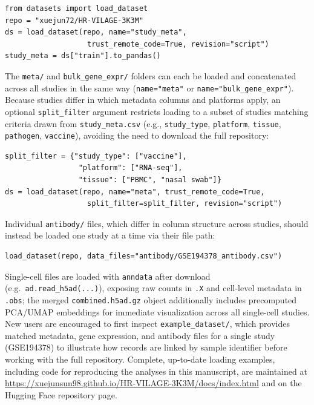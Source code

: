 \documentclass[
  12pt]{article}
\begin{document}
\begin{verbatim}
from datasets import load_dataset
repo = "xuejun72/HR-VILAGE-3K3M"
ds = load_dataset(repo, name="study_meta",
                   trust_remote_code=True, revision="script")
study_meta = ds["train"].to_pandas()
\end{verbatim}

The \texttt{meta/} and \texttt{bulk\_gene\_expr/} folders can each be loaded and concatenated across all studies in the same way (\texttt{name="meta"} or \texttt{name="bulk\_gene\_expr"}). Because studies differ in which metadata columns and platforms apply, an optional \texttt{split\_filter} argument restricts loading to a subset of studies matching criteria drawn from \texttt{study\_meta.csv} (e.g., \texttt{study\_type}, \texttt{platform}, \texttt{tissue}, \texttt{pathogen}, \texttt{vaccine}), avoiding the need to download the full repository:

\begin{verbatim}
split_filter = {"study_type": ["vaccine"],
                 "platform": ["RNA-seq"],
                 "tissue": ["PBMC", "nasal swab"]}
ds = load_dataset(repo, name="meta", trust_remote_code=True,
                   split_filter=split_filter, revision="script")
\end{verbatim}

Individual \texttt{antibody/} files, which differ in column structure across studies, should instead be loaded one study at a time via their file path:

\begin{verbatim}
load_dataset(repo, data_files="antibody/GSE194378_antibody.csv")
\end{verbatim}

\noindent Single-cell files are loaded with \texttt{anndata} after download (e.g.\ \texttt{ad.read\_h5ad(...)}), exposing raw counts in \texttt{.X} and cell-level metadata in \texttt{.obs}; the merged \texttt{combined.h5ad.gz} object additionally includes precomputed PCA/UMAP embeddings for immediate visualization across all single-cell studies. New users are encouraged to first inspect \texttt{example\_dataset/}, which provides matched metadata, gene expression, and antibody files for a single study (GSE194378) to illustrate how records are linked by sample identifier before working with the full repository. Complete, up-to-date loading examples, including code for reproducing the analyses in this manuscript, are maintained at \url{https://xuejunsun98.github.io/HR-VILAGE-3K3M/docs/index.html} and on the Hugging Face repository page.
\end{document}
